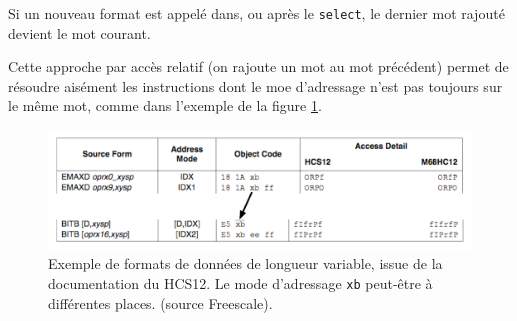 Si un nouveau format est appelé dans, ou après le \texttt{select}, le dernier mot rajouté devient le mot courant.

Cette approche par accès relatif (on rajoute un mot au mot précédent) permet de résoudre aisément les instructions dont le moe d'adressage n'est pas toujours sur le même mot, comme dans l'exemple de la figure \ref{fig:formatLongueurVariable}.
\begin{figure}		%
  \begin{center}
    \includegraphics[width=0.8 \linewidth]{../common/images/formatLongueurVariable.pdf}
    \caption{Exemple de formats de données de longueur variable, issue de la documentation du HCS12. Le mode d'adressage \texttt{xb} peut-être à différentes places. (source Freescale).}
    \label{fig:formatLongueurVariable}
  \end{center}
\end{figure}

